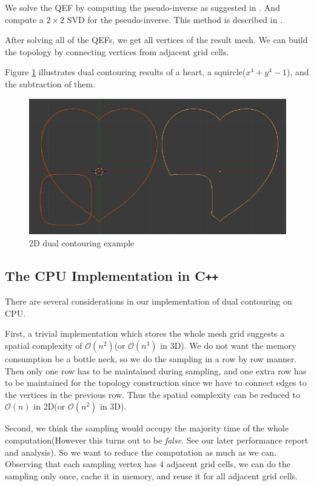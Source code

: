 \documentclass[a4paper,12pt]{article}
\begin{document}
We solve the QEF by computing the pseudo-inverse
as suggested in \cite{ju2002dual}.
And compute a $2\times2$ SVD for the pseudo-inverse.
This method is described in \cite{blinn2003jim}.

After solving all of the QEFs, we get all vertices of the result mesh.
We can build the topology by connecting vertices from
adjacent grid cells.

Figure \ref{fig:2d-dc-example} illustrates dual contouring results
of a heart, a squircle($x^4 + y^4 - 1$),
and the subtraction of them.

\begin{figure}[h]
\centering
\includegraphics[width=0.9 \textwidth]{heart-squircle-subtraction.png}
\caption{2D dual contouring example}
\label{fig:2d-dc-example}
\end{figure}

\subsection{The CPU Implementation in C\texttt{++}}

There are several considerations
in our implementation of dual contouring on CPU.

First, a trivial implementation which stores the whole mesh grid
suggests a spatial complexity of $\mathcal{O}(n^2)$(or $\mathcal{O}(n^3)$
in 3D).
We do not want the memory consumption be a bottle neck,
so we do the sampling in a row by row manner.
Then only one row has to be maintained during sampling,
and one extra row has to be maintained for the topology construction
since we have to connect edges to the vertices in the previous row.
Thus the spatial complexity can be reduced to
$\mathcal{O}(n)$ in 2D(or $\mathcal{O}(n^2)$ in 3D).

Second, we think the sampling would occupy the majority time
of the whole computation(However this turns out to be \emph{false}.
See our later performance report and analysis).
So we want to reduce the computation as much as we can.
Observing that each sampling vertex has $4$ adjacent grid cells,
we can do the sampling only once, cache it in memory,
and reuse it for all adjacent grid cells.
\end{document}
